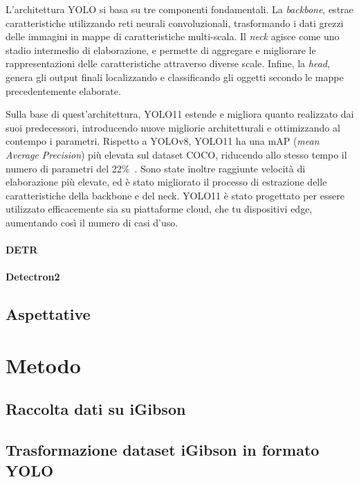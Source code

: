 \documentclass[12pt]{report}
\begin{document}
L'architettura YOLO si basa su tre componenti fondamentali. La \textit{backbone}, estrae caratteristiche utilizzando reti neurali convoluzionali, trasformando i dati grezzi delle immagini in mappe di caratteristiche multi-scala. Il \textit{neck} agisce come uno stadio intermedio di elaborazione, e permette di aggregare e migliorare le rappresentazioni delle caratteristiche attraverso diverse scale. Infine, la \textit{head}, genera gli output finali localizzando e classificando gli oggetti secondo le mappe precedentemente elaborate.

Sulla base di quest'architettura, YOLO11 estende e migliora quanto realizzato dai suoi predecessori, introducendo nuove migliorie architetturali e ottimizzando al contempo i parametri. Rispetto a YOLOv8, YOLO11 ha una mAP (\textit{mean Average Precision}) più elevata sul dataset COCO, riducendo allo stesso tempo il numero di parametri del 22\%~\cite{khanam2024yolov11overviewkeyarchitectural}. Sono state inoltre raggiunte velocità di elaborazione più elevate, ed è stato migliorato il processo di estrazione delle caratteristiche della backbone e del neck. YOLO11 è stato progettato per essere utilizzato efficacemente sia su piattaforme cloud, che tu dispositivi edge, aumentando così il numero di casi d'uso.

\subsubsection{DETR}

\subsubsection{Detectron2}

\section{Aspettative}
\label{chap:aspettative}

\chapter{Metodo}
\label{chap:metodo}

\section{Raccolta dati su iGibson}
\label{chap:raccolta_dati_igibson}

\section{Trasformazione dataset iGibson in formato YOLO}
\label{chap:dataset_igibson_yolo}
\end{document}
